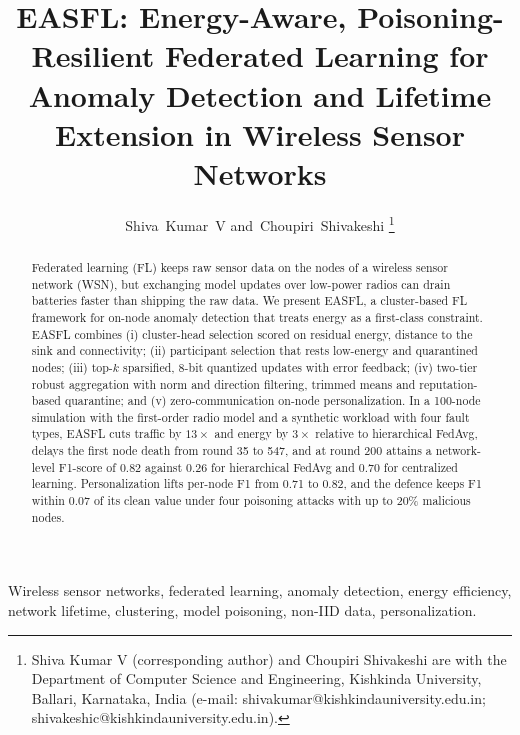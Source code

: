 \documentclass[journal,onecolumn,draftclsnofoot,12pt]{IEEEtran}
\begin{document}
\doublespacing

\title{EASFL: Energy-Aware, Poisoning-Resilient Federated Learning for Anomaly Detection and Lifetime Extension in Wireless Sensor Networks}

\author{Shiva~Kumar~V
and~Choupiri~Shivakeshi
\thanks{Shiva Kumar V (corresponding author) and Choupiri Shivakeshi are with the Department of Computer Science and Engineering, Kishkinda University, Ballari, Karnataka, India (e-mail: shivakumar@kishkindauniversity.edu.in; shivakeshic@kishkindauniversity.edu.in).}}


\maketitle

\begin{abstract}
Federated learning (FL) keeps raw sensor data on the nodes of a wireless sensor network (WSN), but exchanging model updates over low-power radios can drain batteries faster than shipping the raw data. We present EASFL, a cluster-based FL framework for on-node anomaly detection that treats energy as a first-class constraint. EASFL combines (i) cluster-head selection scored on residual energy, distance to the sink and connectivity; (ii) participant selection that rests low-energy and quarantined nodes; (iii) top-$k$ sparsified, 8-bit quantized updates with error feedback; (iv) two-tier robust aggregation with norm and direction filtering, trimmed means and reputation-based quarantine; and (v) zero-communication on-node personalization. In a 100-node simulation with the first-order radio model and a synthetic workload with four fault types, EASFL cuts traffic by $13\times$ and energy by $3\times$ relative to hierarchical FedAvg, delays the first node death from round 35 to 547, and at round 200 attains a network-level F1-score of 0.82 against 0.26 for hierarchical FedAvg and 0.70 for centralized learning. Personalization lifts per-node F1 from 0.71 to 0.82, and the defence keeps F1 within 0.07 of its clean value under four poisoning attacks with up to 20\% malicious nodes.
\end{abstract}

\begin{IEEEkeywords}
Wireless sensor networks, federated learning, anomaly detection, energy efficiency, network lifetime, clustering, model poisoning, non-IID data, personalization.
\end{IEEEkeywords}
\end{document}
